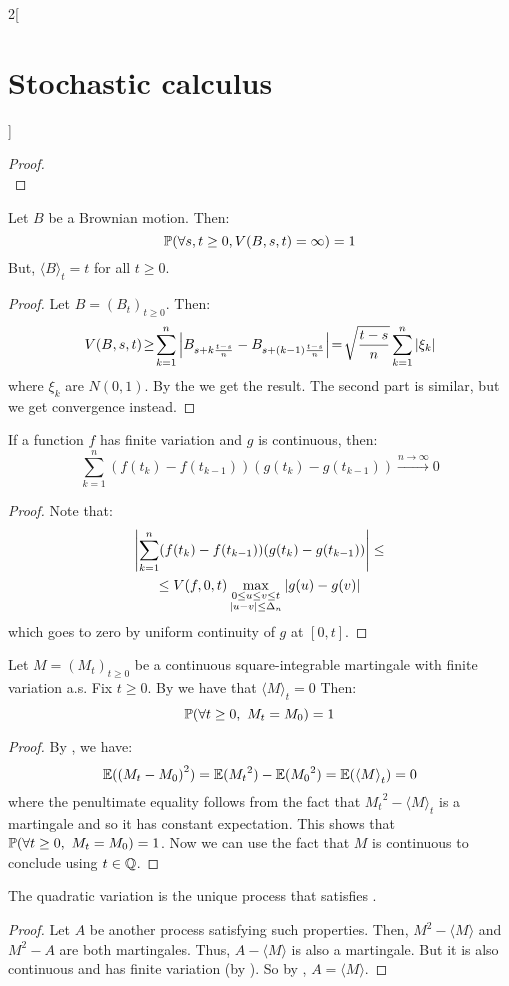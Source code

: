 \documentclass[../../../main_math.tex]{subfiles}
\begin{document}
\begin{multicols}{2}[\section{Stochastic calculus}]
\begin{proof}
$$    $$
  \end{proof}
  \begin{proposition}
    Let $B$ be a Brownian motion. Then:
    $$
      \mathbb{P}(\forall s,t\geq 0, V(B,s,t)=\infty)=1
    $$
    But, ${\langle B\rangle}_t=t$ for all $t\geq 0$.
  \end{proposition}
  \begin{proof}
    Let $B={(B_t)}_{t\geq 0}$. Then:
    $$
      V(B,s,t)\!\geq\! \sum_{k=1}^{n}\abs{B_{s+k\frac{t-s}{n}}-B_{s+(k-1)\frac{t-s}{n}}}\!=\!\sqrt{\frac{t-s}{n}}\sum_{k=1}^{n}\abs{\xi_k}
    $$
    where $\xi_k$ are \iid $N(0,1)$. By the  we get the result. The second part is similar, but we get convergence instead.
  \end{proof}
  \begin{proposition}\label{SC:prop_variation_fg}
    If a function $f$ has finite variation and $g$ is continuous, then:
    $$
      \sum_{k=1}^n(f(t_k)-f(t_{k-1}))(g(t_k)-g(t_{k-1}))\overset{n\to\infty}{\longrightarrow}0
    $$
  \end{proposition}
  \begin{proof}
    Note that:
    \begin{multline*}
      \abs{\sum_{k=1}^n(f(t_k)-f(t_{k-1}))(g(t_k)-g(t_{k-1}))}\leq\\\leq V(f,0,t)\max_{\substack{0\leq u\leq v\leq t\\\abs{u-v}\leq \Delta_n}}\abs{g(u)-g(v)}
    \end{multline*}
    which goes to zero by uniform continuity of $g$ at $[0,t]$.
  \end{proof}
  \begin{corollary}\label{SC:corollary_finite_variation}
    Let $M={(M_t)}_{t\geq 0}$ be a continuous square-integrable martingale with finite variation a.s. Fix $t\geq 0$. By  we have that ${\langle M\rangle}_t=0$
    Then:
    $$
      \Prob(\forall t\geq 0,\ M_t=M_0)=1
    $$
  \end{corollary}
  \begin{proof}
    By , we have:
    $$
      \mathbb{E}({(M_t-M_0)}^2)=\mathbb{E}({M_t}^2) - \mathbb{E}({M_0}^2) = \mathbb{E}({\langle M\rangle}_t)=0
    $$
    where the penultimate equality follows from the fact that ${M_t}^2-{\langle M\rangle}_t$ is a martingale and so it has constant expectation. This shows that $\mathbb{P} (\forall t\geq 0,\ M_t=M_0)=1$. Now we can use the fact that $M$ is continuous to conclude using $t\in\mathbb{Q}$.
  \end{proof}
  \begin{proposition}
    The quadratic variation is the unique process that satisfies .
  \end{proposition}
  \begin{proof}
    Let $A$ be another process satisfying such properties. Then, ${M}^2-{\langle M\rangle}$ and ${M}^2-A$ are both martingales. Thus, $A-{\langle M\rangle}$ is also a martingale. But it is also continuous and has finite variation (by ). So by , $A={\langle M\rangle}$.
  \end{proof}

\end{multicols}
\end{document}
